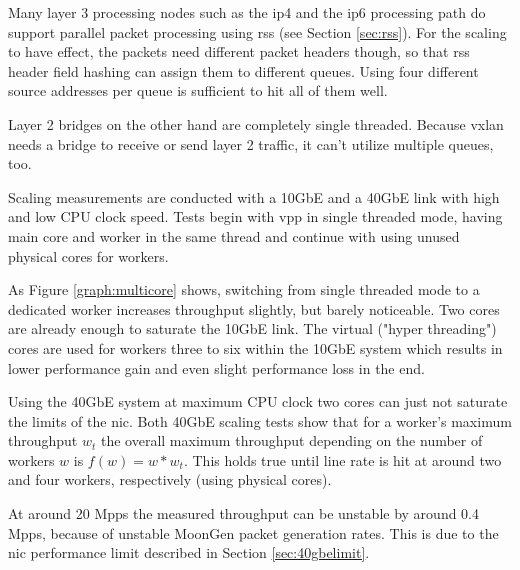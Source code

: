 Many layer 3 processing nodes such as the \Ac{ip4} and the \Ac{ip6}
processing path do support parallel packet processing using \Ac{rss}
(see Section \ref{sec:rss}). For the scaling to have effect, the
packets need different packet headers though, so that \Ac{rss} header
field hashing can assign them to different queues. Using four
different source addresses per queue is sufficient to hit all of them
well.

Layer 2 bridges on the other hand are completely single threaded.
Because \Ac{vxlan} needs a bridge to receive or send layer 2 traffic,
it can't utilize multiple queues, too.

Scaling measurements are conducted with a 10GbE and a 40GbE link with
high and low CPU clock speed. Tests begin with \Ac{vpp} in
single threaded mode, having main core and worker in the same thread
and continue with using unused physical cores for workers.

As Figure \ref{graph:multicore} shows, switching from single threaded
mode to a dedicated worker increases throughput slightly, but barely
noticeable. Two cores are already enough to saturate the 10GbE link.
The virtual ("hyper threading") cores are used for workers three to
six within the 10GbE system which results in lower performance gain
and even slight performance loss in the end.

Using the 40GbE system at maximum CPU clock two cores can just not
saturate the limits of the \Ac{nic}. Both 40GbE scaling tests show
that for a worker's maximum throughput $w_{t}$ the overall maximum
throughput depending on the number of workers $w$ is $f(w) = w *
w_{t}$. This holds true until line rate is hit at around two and four
workers, respectively (using physical cores).

At around 20 Mpps the measured throughput can be unstable by around 0.4
Mpps, because of unstable MoonGen packet generation rates. This is
due to the \Ac{nic} performance limit described in Section
\ref{sec:40gbelimit}.





